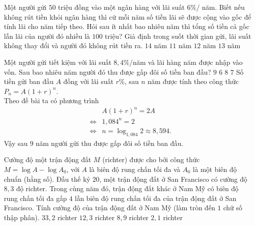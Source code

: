\begin{ex}
	Một người gửi $50$ triệu đồng vào một ngân hàng với lãi suất $6\%$/ năm. Biết nếu không rút tiền khỏi ngân hàng thì cứ mỗi năm số tiền lãi sẽ được cộng vào gốc để tính lãi cho năm tiếp theo. Hỏi sau ít nhất bao nhiêu năm thì tổng số tiền cả gốc lẫn lãi của người đó nhiều là $100$ triệu? Giả định trong suốt thời gian gửi, lãi suất không thay đổi và người đó không rút tiền ra.
	\choice
	{$14$ năm}
	{$11$ năm }
	{\True $12$ năm}
	{$13$ năm}
\end{ex}

\begin{ex}
	Một người gửi tiết kiệm với lãi suất $8{,}4\%$/năm và lãi hàng năm được nhập vào vốn. Sau bao nhiêu năm người đó thu được gấp đôi số tiền ban đầu?
	\choice
	{\True $9$}
	{$6$}
	{$8$}
	{$7$}
	\loigiai
	{
		Số tiền gửi ban đầu $A$ đồng với lãi suất $r$\%, sau $n$ năm được tính theo công thức $P_n=A(1+r)^n$.\\
		Theo đề bài ta có phương trình
		\begin{eqnarray*}
			& & A(1+r)^n=2A\\
			& \Leftrightarrow & 1{,}084^n=2\\
			& \Leftrightarrow & n=\log_{1{,}084} 2\approx 8{,}594.
		\end{eqnarray*}
		Vậy sau $9$ năm người gửi thu được gấp đôi số tiền ban đầu.
	}
\end{ex}
\begin{ex}
	Cường độ một trận động đất $M$ (richter) được cho bởi công thức $M=\log A-\log A_0$, với $A$ là biên độ rung chấn tối đa và $A_0$ là một biên độ chuẩn (hằng số). Đầu thế kỷ $20$, một trận động đất ở San Francisco có cường độ $8{,}3$ độ richter. Trong cùng năm đó, trận động đất khác ở Nam Mỹ có biên độ rung chấn tối đa gấp $4$ lần biên độ rung chấn tối đa của trận động đất ở San Francisco. Tính cường độ của trận động đất ở Nam Mỹ (làm tròn đến $1$ chữ số thập phân).
	\choice
	{$33{,}2$ richter}
	{$12{,}3$ richter}
	{ \True $8{,}9$ richter}
	{$2{,}1$ richter}
\end{ex}

